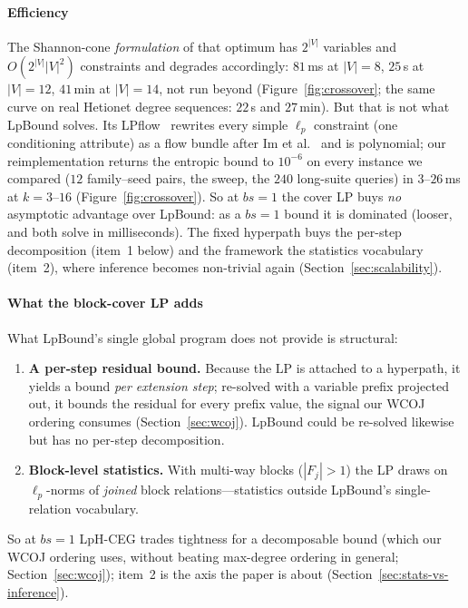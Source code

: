 \documentclass[sigconf, nonacm, acmthm=false]{acmart}
\newcommand{\block}{F}
\begin{document}
\paragraph{Efficiency}
The Shannon-cone \emph{formulation} of that optimum has $2^{|V|}$
variables and $O(2^{|V|}|V|^2)$ constraints and degrades accordingly:
$81$\,ms at $|V|{=}8$, $25$\,s at $|V|{=}12$, $41$\,min at $|V|{=}14$,
not run beyond (Figure~\ref{fig:crossover}; the same curve on real Hetionet degree sequences: $22$\,s and $27$\,min). But that is not what
LpBound solves. Its LPflow~\cite[Thm.~4.5]{zhang2025lpbound} rewrites
every simple $\ell_p$ constraint (one conditioning attribute) as a flow
bundle after Im et al.~\cite{im2025simple} and is polynomial; our
reimplementation returns the entropic bound to $10^{-6}$ on every
instance we compared ($12$ family--seed pairs, the sweep, the $240$ long-suite queries) in $3$--$26$\,ms at $k{=}3$--$16$
(Figure~\ref{fig:crossover}). So at $bs{=}1$ the cover LP buys
\emph{no} asymptotic advantage over LpBound: as a $bs{=}1$ bound it is
dominated (looser, and both solve in milliseconds). The fixed hyperpath buys the per-step decomposition
(item~1 below) and the framework the statistics vocabulary (item~2), where
inference becomes non-trivial again (Section~\ref{sec:scalability}).

\paragraph{What the block-cover LP adds}
What LpBound's single global program does not provide is structural:
\begin{enumerate}
\item \textbf{A per-step residual bound.} Because the LP is attached to
  a hyperpath, it yields a bound \emph{per extension step}; re-solved with a
  variable prefix projected out, it bounds the residual for every prefix
  value, the signal our WCOJ ordering consumes (Section~\ref{sec:wcoj}).
  LpBound could be re-solved likewise but has no per-step decomposition.
\item \textbf{Block-level statistics.} With multi-way blocks
  ($|\block_j| > 1$) the LP draws on $\ell_p$-norms of \emph{joined}
  block relations---statistics outside LpBound's single-relation
  vocabulary.
\end{enumerate}
So at $bs{=}1$ LpH-CEG trades tightness for a decomposable bound (which our WCOJ ordering uses, without beating max-degree ordering in general; Section~\ref{sec:wcoj}); item~2 is the axis the paper is about
(Section~\ref{sec:stats-vs-inference}).
\end{document}
